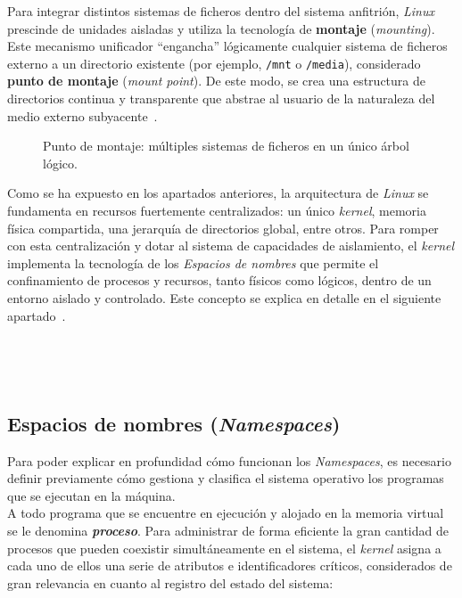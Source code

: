 Para integrar distintos sistemas de ficheros dentro del sistema anfitrión, \textit{Linux} prescinde de unidades aisladas y utiliza la tecnología de \textbf{montaje} (\textit{mounting}).
Este mecanismo unificador ``engancha'' lógicamente cualquier sistema de ficheros externo a un directorio existente (por ejemplo, \texttt{/mnt} o \texttt{/media}), considerado \textbf{punto de montaje} (\textit{mount point}).
De este modo, se crea una estructura de directorios continua y transparente que abstrae al usuario de la naturaleza del medio externo subyacente~\cite{love_linux}.\\

\begin{figure}[h!]
  \centering
  \scalebox{0.8}{}
  \caption{Punto de montaje: múltiples sistemas de ficheros en un único árbol lógico.}
  \label{fig:mounting_point}
\end{figure}

Como se ha expuesto en los apartados anteriores, la arquitectura de \textit{Linux} se fundamenta en recursos fuertemente centralizados: un único \textit{kernel}, memoria física compartida, una jerarquía de directorios global, entre otros.
Para romper con esta centralización y dotar al sistema de capacidades de aislamiento, el \textit{kernel} implementa la tecnología de los \textit{Espacios de nombres} que permite el confinamiento de procesos y recursos, tanto físicos como lógicos, dentro de un entorno aislado y controlado.
Este concepto se explica en detalle en el siguiente apartado~\cite{librossoo, love_linux}.

\

\

\subsection{Espacios de nombres (\textit{Namespaces})}
\label{sec:namespaces}

Para poder explicar en profundidad cómo funcionan los \textit{Namespaces}, es necesario definir previamente cómo gestiona y clasifica el sistema operativo los programas que se ejecutan en la máquina.\\

A todo programa que se encuentre en ejecución y alojado en la memoria virtual se le denomina \textbf{\textit{proceso}}.
Para administrar de forma eficiente la gran cantidad de procesos que pueden coexistir simultáneamente en el sistema, el \textit{kernel} asigna a cada uno de ellos una serie de atributos e identificadores críticos, considerados de gran relevancia en cuanto al registro del estado del sistema:

